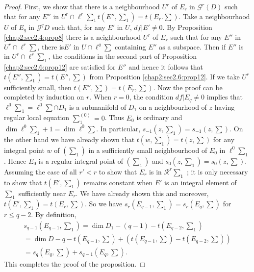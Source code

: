 \begin{proof}
  First,  we show that there is a neighbourhood $U^r$ of $E_r$ in
  $\mathscr{G}^r (D)$ such that for any $E''$ in $U^r \cap \ell^r
  \sum_1 t(E'',  \sum_1) = t(E_r. \sum)$. Take a neighbourhood $U$ of
  $E_q$ in $\mathscr{G}^q D$ such that,  for any $E'$ in $U$,  $df
  \big | E' \neq 0$. By Proposition \ref{chap2:sec2.4:prop8} there is
  a neighbourhood $U^r$ 
  of $E_r$ such that for any $E''$ in $U^r \cap \ell^r \sum$,  there
  is\pageoriginale $E'$ in $U \cap \ell^q \sum$ containing $E''$ as a
  subspace. Then 
  if $E''$ is in $U^r \cap \ell^r \sum_1$,  the conditions in the
  second part of Proposition \ref{chap2:sec2.6:prop12} are satisfied
  for $E''$ and hence it 
  follows that $t (E'',  \sum_1) = t(E'',  \sum)$ from Proposition
  \ref{chap2:sec2.6:prop12}. If we take $U^r$ sufficiently small,  then $t(E'',  \sum) =
  t(E_r,  \sum)$. Now the proof can be completed by induction on
  $r$. When $r = 0$,  the condition $df \big | E_q \neq 0$ implies
  that $\ell^0 \sum_1= \ell^0 \sum \cap D_1$ is a submanifold of $D_1$
  on a neighbourhood of $z$ having regular local equation
  $\sum^{(0)}_1 = 0$. Thus $E_0$ is ordinary and $\dim \ell^0 \sum_1 +
  1 = \dim \ell^0 \sum$. In particular,  $s_{-1} (z,  \sum_1) = s_{-1}
  (z,  \sum)$. On the other hand we have already shown that $t (w,
  \sum_1) = t (z,  \sum)$ for any integral point $w$ of $(\sum_1)$ in
  a sufficiently small neighbourhood of $E_0$ in $\ell^0
  \sum_1$. Hence $E_0$ is a regular  integral point of $(\sum_1) $ and
  $s_0 (z,  \sum_1) = s_0 (z,  \sum)$. Assuming the case of all $r' <
  r$ to show that $E_r$ is in $\mathscr{R}^r \sum_1$ ; it is only
  necessary to show that $t(E',  \sum_1)$ remains constant when $E'$
  is an integral element of $\sum_1$ sufficiently near $E_r$. We have
  already shown this and moreover,  $t(E',  \sum_1) = t (E_r,
  \sum)$. So we have $s_r (E_{q-1},  \sum_1) = s_r (E_q,  \sum)$ for
  $r \le q - 2$. By definition,   
  \begin{multline*}
    s_{q-1} \left(E_{q-1},  \sum_1\right)  = \dim D_1 - (q-1) - t
    \left(E_{q-2},  \sum_1\right)\\ 
     = \dim D- q -t \left(E_{q-1},  \sum\right) + \left(t \left(E_{q-1},
    \sum \right) -t \left(E_{q-2},  \sum\right)\right)\\
      = s_q \left(E_q,  \sum\right) + s_{q-1} \left(E_q, \sum\right).
  \end{multline*}
This completes the proof of the proposition.
\end{proof}

